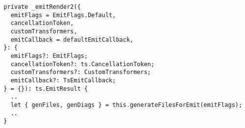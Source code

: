 \begin{verbatim}
  private _emitRender2({
    emitFlags = EmitFlags.Default,
    cancellationToken,
    customTransformers,
    emitCallback = defaultEmitCallback,
  }: {
    emitFlags?: EmitFlags;
    cancellationToken?: ts.CancellationToken;
    customTransformers?: CustomTransformers;
    emitCallback?: TsEmitCallback;
  } = {}): ts.EmitResult {
    ..
    let { genFiles, genDiags } = this.generateFilesForEmit(emitFlags);
    ..
  }
\end{verbatim}
